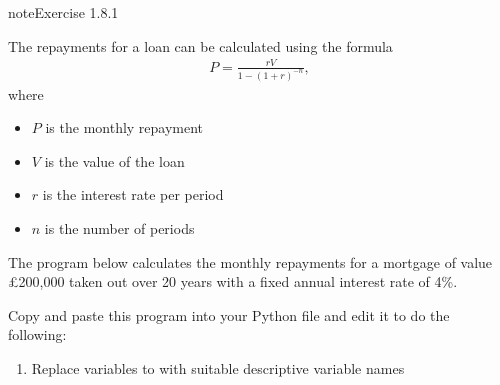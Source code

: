 \documentclass[letterpaper,10pt,english]{jupyterBook}
\begin{document}
\begin{sphinxadmonition}{note}{Exercise 1.8.1}



\sphinxAtStartPar
The repayments for a loan can be calculated using the formula
\begin{equation*}
\begin{split} P = \frac{rV}{1 - (1 + r)^{-n}}, \end{split}
\end{equation*}
\sphinxAtStartPar
where
\begin{itemize}
\item {} 
\sphinxAtStartPar
\(P\) is the monthly repayment

\item {} 
\sphinxAtStartPar
\(V\) is the value of the loan

\item {} 
\sphinxAtStartPar
\(r\) is the interest rate per period

\item {} 
\sphinxAtStartPar
\(n\) is the number of periods

\end{itemize}

\sphinxAtStartPar
The program below calculates the monthly repayments for a mortgage of value £200,000 taken out over 20 years with a fixed annual interest rate of 4\%.

\begin{sphinxVerbatim}[commandchars=\\\{\}]
\end{sphinxVerbatim}

\sphinxAtStartPar
Copy and paste this program into your Python file and edit it to do the following:
\begin{enumerate}
%
\item {} 
\sphinxAtStartPar
Replace variables  to  with suitable descriptive variable names


\end{enumerate}
\end{sphinxadmonition}
\end{document}

